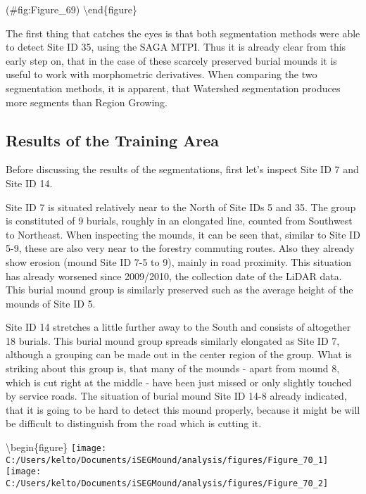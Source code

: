 \documentclass[
]{article}
\begin{document}
(\#fig:Figure\_69)
\textbackslash end\{figure\}

The first thing that catches the eyes is that both segmentation methods were able to detect Site ID 35, using the SAGA MTPI. Thus it is already clear from this early step on, that in the case of these scarcely preserved burial mounds it is useful to work with morphometric derivatives. When comparing the two segmentation methods, it is apparent, that Watershed segmentation produces more segments than Region Growing.

\hypertarget{results-of-the-training-area}{%
\subsection{\texorpdfstring{\textbf{Results of the Training Area}}{Results of the Training Area}}\label{results-of-the-training-area}}

Before discussing the results of the segmentations, first let's inspect Site ID 7 and Site ID 14.

Site ID 7 is situated relatively near to the North of Site IDs 5 and 35. The group is constituted of 9 burials, roughly in an elongated line, counted from Southwest to Northeast. When inspecting the mounds, it can be seen that, similar to Site ID 5-9, these are also very near to the forestry commuting routes. Also they already show erosion (mound Site ID 7-5 to 9), mainly in road proximity. This situation has already worsened since 2009/2010, the collection date of the LiDAR data. This burial mound group is similarly preserved such as the average height of the mounds of Site ID 5.

Site ID 14 stretches a little further away to the South and consists of altogether 18 burials. This burial mound group spreads similarly elongated as Site ID 7, although a grouping can be made out in the center region of the group. What is striking about this group is, that many of the mounds - apart from mound 8, which is cut right at the middle - have been just missed or only slightly touched by service roads. The situation of burial mound Site ID 14-8 already indicated, that it is going to be hard to detect this mound properly, because it might be will be difficult to distinguish from the road which is cutting it.

\textbackslash begin\{figure\}
\texttt{[image: C:/Users/kelto/Documents/iSEGMound/analysis/figures/Figure\_70\_1]} \texttt{[image: C:/Users/kelto/Documents/iSEGMound/analysis/figures/Figure\_70\_2]}
\end{document}
